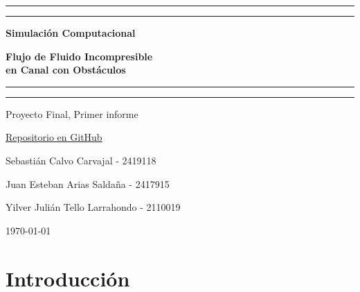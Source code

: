 \documentclass[12pt, a4paper]{article}
\begin{document}
\begin{titlepage}
  \centering
  \vspace*{2cm}
  {\color{azulTitulo}\rule{\linewidth}{1.5pt}}\par\vspace{0.4cm}
  {\color{azulTitulo}\rule{\linewidth}{0.4pt}}\par\vspace{1cm}

  {\Huge\bfseries\color{azulTitulo}
    Simulación Computacional}\par\vspace{0.4cm}
  {\LARGE\bfseries\color{azulTitulo}
    Flujo de Fluido Incompresible\\[0.3em]
    en Canal con Obstáculos}\par\vspace{1cm}

  {\color{azulTitulo}\rule{\linewidth}{0.4pt}}\par\vspace{0.3cm}
  {\color{azulTitulo}\rule{\linewidth}{1.5pt}}\par\vspace{2cm} 

  {\large Proyecto Final, Primer informe}\par\vspace{0.75cm}
    {\href{https://github.com/GG2R10/-streamfunction-vorticity-2d-nr}{Repositorio en GitHub}}\par\vspace{1.5cm}

    {\large Sebastián Calvo Carvajal - 2419118}\par\vspace{0.25cm}
    {\large Juan Esteban Arias Saldaña - 2417915}\par\vspace{0.25cm}
    {\large Yilver Julián Tello Larrahondo - 2110019}\par\vspace{0.5cm}

  {\large\today}\par
  \vfill
\end{titlepage}

\tableofcontents
\newpage

\section{Introducción}
\end{document}
